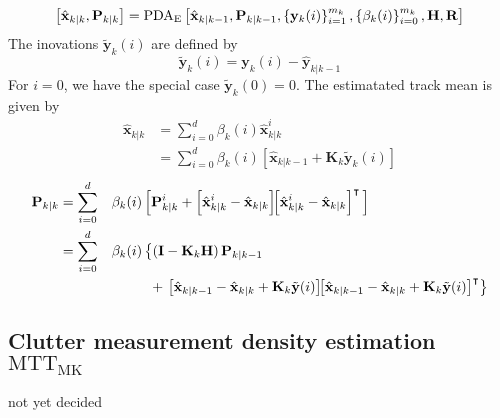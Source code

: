 \begin{equation}
    \left[\hat{\mathbf x}_{k|k}, \mathbf P_{k|k}\right] = \text{PDA}_\text E \left[\hat{\mathbf x}_{k|k-1}, \mathbf P_{k|k-1}, \left\{ \mathbf y_k(i)\right\}^{m_k}_{i=1}, \left\{ \mathbf \beta_k(i)\right\}^{m_k}_{i=0}, \mathbf H, \mathbf R\right]
\end{equation}
The inovations $\tilde{\mathbf y}_k(i)$ are defined by
\begin{equation}
    \tilde{\mathbf y}_k(i) = \mathbf y_k(i) - \hat{\mathbf y}_{k|k-1}
\end{equation}
For $i=0$, we have the special case $\tilde{\mathbf y}_k(0) = 0$.
The estimatated track mean is given by
\begin{equation}
    \begin{split}
        \hat{\mathbf x}_{k|k} &= \sum_{i=0}^{d}\beta_k(i)\hat{\mathbf x}^i_{k|k}\\
        &=\sum_{i=0}^{d}\beta_k(i)\left[ \hat{\mathbf x}_{k|k-1} + \mathbf K_k \tilde{\mathbf y}_k(i) \right]
    \end{split}
\end{equation}
\begin{equation}
    \begin{aligned}
        \mathbf P_{k|k} & = \sum^d_{i=0} &  & \beta_k(i)  \left[ \mathbf P^i_{k|k} + \left[ \hat{\mathbf x}^i_{k|k} - \hat{\mathbf x}_{k|k} \right]\!\!\left[ \hat{\mathbf x}^i_{k|k} - \hat{\mathbf x}_{k|k} \right]^\intercal \, \right]                                                              \\
                        & = \sum^d_{i=0} &  & \beta_k(i)  \left\{\left( \mathbf I - \mathbf K_k\mathbf H \right)  \mathbf P_{k|k-1} \right.                                                                                                                                                                            \\
                        & ~              &  & \hphantom{\beta_k(i)\{} +\left.  \left[ \hat{\mathbf x}_{k|k-1} -\hat{\mathbf x}_{k|k} + \mathbf K_k \tilde{\mathbf y}(i) \right] \!\!\left[ \hat{\mathbf x}_{k|k-1} -\hat{\mathbf x}_{k|k} + \mathbf K_k \tilde{\mathbf y}(i) \right]^\intercal \right\}
    \end{aligned}
\end{equation}
\subsection{Clutter measurement density estimation \texorpdfstring{$\text{MTT}_\text{MK}$}{MTT MK}}\label{sec:MTT}
not yet decided
